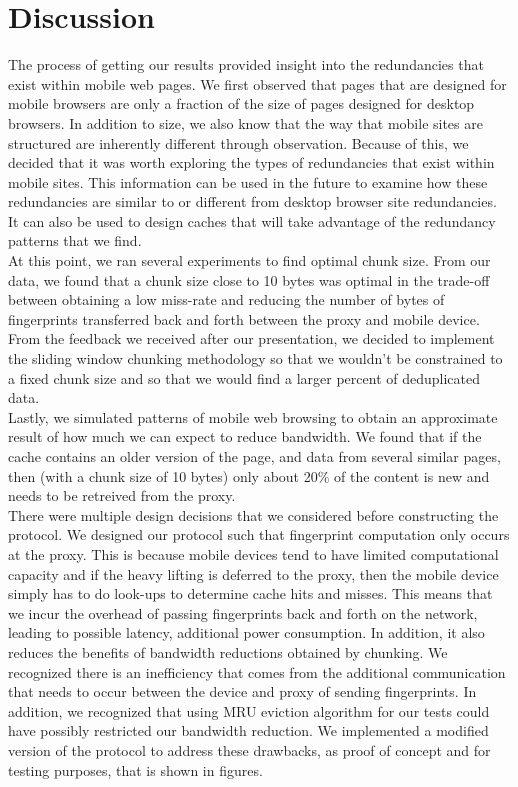 \section{Discussion}
\label{sec:discussion}
The process of getting our results provided insight into the redundancies that exist within mobile web pages. We first observed that pages that are designed for mobile browsers are only a fraction of the size of pages designed for desktop browsers. In addition to size, we also know that the way that mobile sites are structured are inherently different through observation. Because of this, we decided that it was worth exploring the types of redundancies that exist within mobile sites. This information can be used in the future to examine how these redundancies are similar to or different from desktop browser site redundancies. It can also be used to design caches that will take advantage of the redundancy patterns that we find.  \\

At this point, we ran several experiments to find optimal chunk size. From our data, we found that a chunk size close to 10 bytes was optimal in the trade-off between obtaining a low miss-rate and reducing the number of bytes of fingerprints transferred back and forth between the proxy and mobile device. From the feedback we received after our presentation, we decided to implement the sliding window chunking methodology so that we wouldn't be constrained to a fixed chunk size and so that we would find a larger percent of deduplicated data. \\

Lastly, we simulated patterns of mobile web browsing to obtain an approximate result of how much we can expect to reduce bandwidth. We found that if the cache contains an older version of the page, and data from several similar pages, then (with a chunk size of 10 bytes) only about 20\% of the content is new and needs to be retreived from the proxy. \\

There were multiple design decisions that we considered before constructing the protocol. We designed our protocol such that fingerprint computation only occurs at the proxy. This is because mobile devices tend to have limited computational capacity and if the heavy lifting is deferred to the proxy, then the mobile device simply has to do look-ups to determine cache hits and misses. This means that we incur the overhead of passing fingerprints back and forth on the network, leading to possible latency, additional power consumption. In addition, it also reduces the benefits of bandwidth reductions obtained by chunking. We recognized there is an inefficiency that comes from the additional communication that needs to occur between the device and proxy of sending fingerprints. In addition, we recognized that using MRU eviction algorithm for our tests could have possibly restricted our bandwidth reduction. We implemented a modified version of the protocol to address these drawbacks, as proof of concept and for testing purposes, that is shown in figures. \\

